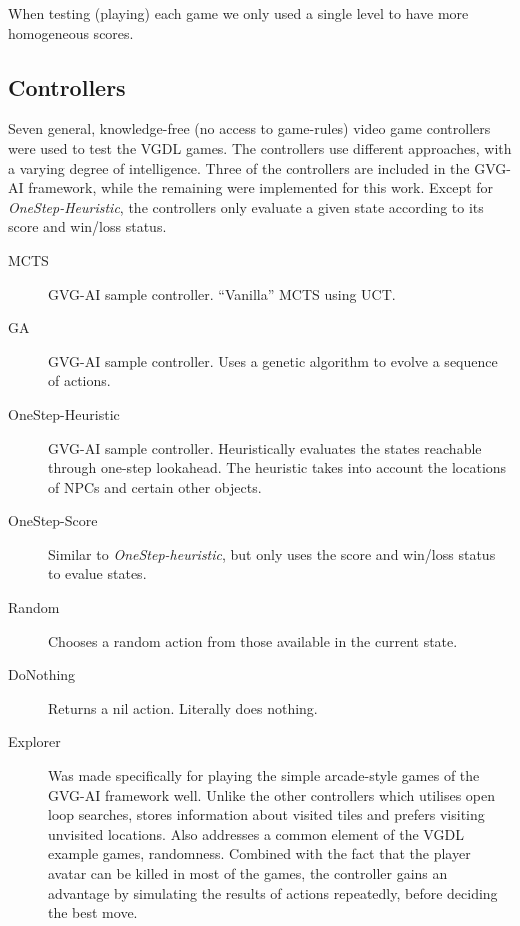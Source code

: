 \documentclass{llncs}
\begin{document}
When testing (playing) each game we only used a single level to have more homogeneous scores.


\subsection{Controllers}
\label{method:controllers}

Seven general, knowledge-free (no access to game-rules) video game controllers were used to test the VGDL games. The controllers use different approaches, with a varying degree of intelligence. Three of the controllers are included in the GVG-AI framework, while the remaining were implemented for this work. Except for \emph{OneStep-Heuristic}, the controllers only evaluate a given state according to its score and win/loss status.

\begin{description}
	\item [MCTS] GVG-AI sample controller. ``Vanilla'' MCTS using UCT.
	\item [GA] GVG-AI sample controller. Uses a genetic algorithm to evolve a sequence of actions.
	\item [OneStep-Heuristic] GVG-AI sample controller. Heuristically evaluates the states reachable through one-step lookahead. The heuristic takes into account the locations of NPCs and certain other objects.
    \item [OneStep-Score] Similar to \emph{OneStep-heuristic}, but only uses the score and win/loss status to evalue states.
    \item [Random] Chooses a random action from those available in the current state.
	\item [DoNothing] Returns a nil action. Literally does nothing.
	\item [Explorer] Was made specifically for playing the simple arcade-style games of the GVG-AI framework well. Unlike the other controllers which utilises open loop searches, stores information about visited tiles and prefers visiting unvisited locations. Also addresses a common element of the VGDL example games, randomness. Combined with the fact that the player avatar can be killed in most of the games, the controller gains an advantage by simulating  the results of actions repeatedly, before deciding the best move.
\end{description}
\end{document}
